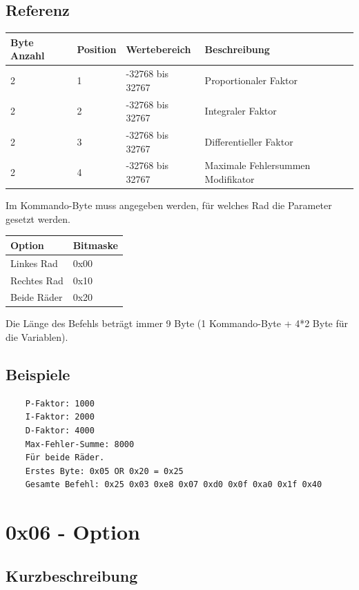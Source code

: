 \documentclass[a4paper]{article}
\begin{document}
	\subsection{Referenz}

	\begin{tabularx}{\linewidth}{|l|l|l|X|}
		\hline
		\textbf{Byte Anzahl} & \textbf{Position} & \textbf{Wertebereich} & \textbf{Beschreibung} \\
		\hline
		\hline
		2					 & 1 & -32768 bis 32767 & Proportionaler Faktor\\
		\hline
		2					 & 2 & -32768 bis 32767 & Integraler Faktor\\
		\hline
		2					 & 3 & -32768 bis 32767 & Differentieller Faktor\\
		\hline
		2					 & 4 & -32768 bis 32767 & Maximale Fehlersummen Modifikator\\
		\hline
	\end{tabularx}

	Im Kommando-Byte muss angegeben werden, für welches Rad die Parameter gesetzt werden.

	\begin{tabularx}{\linewidth}{|l|X|}
		\hline
		\textbf{Option} & \textbf{Bitmaske} \\
		\hline
		\hline
		Linkes Rad	& 0x00 \\
		\hline
		Rechtes Rad	& 0x10 \\
		\hline
		Beide Räder & 0x20 \\
		\hline
	\end{tabularx}

	Die Länge des Befehls beträgt immer 9 Byte (1 Kommando-Byte + 4*2 Byte für die Variablen).

	\subsection{Beispiele}
	\begin{verbatim}
	P-Faktor: 1000
	I-Faktor: 2000
	D-Faktor: 4000
	Max-Fehler-Summe: 8000
	Für beide Räder.
	Erstes Byte: 0x05 OR 0x20 = 0x25
	Gesamte Befehl: 0x25 0x03 0xe8 0x07 0xd0 0x0f 0xa0 0x1f 0x40
	\end{verbatim}
	\pagebreak


	\section{0x06 - Option}

	\subsection{Kurzbeschreibung}
\end{document}
